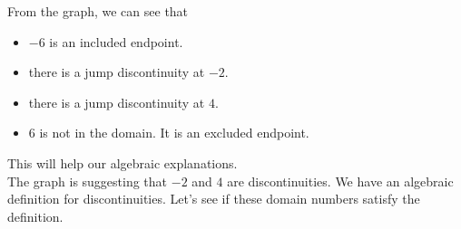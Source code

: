 \documentclass{ximera}
\begin{document}
\begin{observation} 
From the graph, we can see that 

\begin{itemize}
\item $-6$ is an included endpoint.  
\item there is a jump discontinuity at $-2$.
\item there is a jump discontinuity at $4$.
\item $6$ is not in the domain. It is an excluded endpoint.
\end{itemize}



\end{observation}


This will help our algebraic explanations. \\


The graph is suggesting that $-2$ and $4$ are discontinuities.  We have an algebraic definition for discontinuities.  Let's see if these domain numbers satisfy the definition. \\
\end{document}
